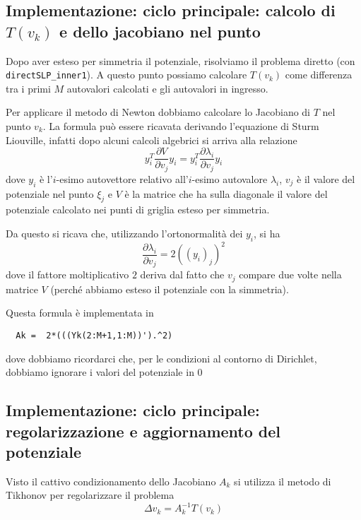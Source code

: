 \documentclass[a4paper,10pt]{article}
\theoremstyle{plain}
\theoremstyle{definition}
\theoremstyle{remark}
\newcommand{\der}[2]{\frac{\partial #1}{\partial #2}}
\begin{document}
\subsection{Implementazione: ciclo principale: calcolo di $T(v_k)$ e dello jacobiano nel punto}

Dopo aver esteso per simmetria il potenziale, risolviamo il problema
diretto (con \lstinline{directSLP_inner1}). A questo punto possiamo
calcolare $T(v_k)$ come differenza tra i primi $M$ autovalori
calcolati e gli autovalori in ingresso.

Per applicare il metodo di Newton dobbiamo calcolare lo Jacobiano di
$T$ nel punto $v_k$. La formula può essere ricavata derivando
l'equazione di Sturm Liouville, infatti dopo alcuni calcoli algebrici
si arriva alla relazione
\begin{equation*}
  y_i ^T \der{V}{v_j} y_i = y_i ^T \der{\lambda _i}{v_j} y_i
\end{equation*}
dove $y_i$ è l'$i$-esimo autovettore relativo all'$i$-esimo autovalore
$\lambda _i$, $v_j$ è il valore del potenziale nel punto $\xi_j$ e $V$
è la matrice che ha sulla diagonale il valore del potenziale calcolato
nei punti di griglia esteso per simmetria.

Da questo si ricava che, utilizzando l'ortonormalità dei $y_i$, si ha
\begin{equation*}
  \der{\lambda _i}{v_j} = 2 ((y_i)_j) ^2
\end{equation*}
dove il fattore moltiplicativo $2$ deriva dal fatto che $v_j$ compare
due volte nella matrice $V$ (perché abbiamo esteso il potenziale con
la simmetria).

Questa formula è implementata in
\begin{lstlisting}
  Ak =  2*(((Yk(2:M+1,1:M))').^2)
\end{lstlisting}
dove dobbiamo ricordarci che, per le condizioni al contorno di
Dirichlet, dobbiamo ignorare i valori del potenziale in $0$

\subsection{Implementazione: ciclo principale: regolarizzazione e
  aggiornamento del potenziale}

Visto il cattivo condizionamento dello Jacobiano $A_k$ si utilizza il
metodo di Tikhonov per regolarizzare il problema 
\begin{equation*}
  \Delta v _k = A_k ^{-1} T(v_k)
\end{equation*}
\end{document}
